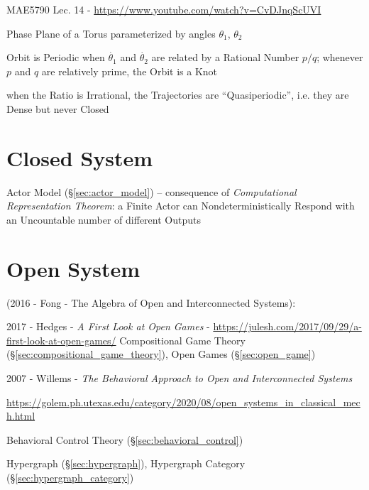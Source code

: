 MAE5790 Lec. 14 - \url{https://www.youtube.com/watch?v=CvDJnqScUVI}

Phase Plane of a Torus parameterized by angles $\theta_1$, $\theta_2$

Orbit is Periodic when $\dot{\theta_1}$ and $\dot{\theta_2}$ are related by a
Rational Number $p/q$; whenever $p$ and $q$ are relatively prime, the Orbit is a
Knot

when the Ratio is Irrational, the Trajectories are ``Quasiperiodic'', i.e. they
are Dense but never Closed



\section{Closed System}\label{sec:closed_system}


Actor Model (\S\ref{sec:actor_model}) -- consequence of \emph{Computational
  Representation Theorem}: a Finite Actor can Nondeterministically Respond with
an Uncountable number of different Outputs %



\section{Open System}\label{sec:open_system}

(2016 - Fong - The Algebra of Open and Interconnected Systems):

2017 - Hedges - \emph{A First Look at Open Games} -
\url{https://julesh.com/2017/09/29/a-first-look-at-open-games/} \fist
Compositional Game Theory (\S\ref{sec:compositional_game_theory}), Open Games
(\S\ref{sec:open_game})

2007 - Willems - \emph{The Behavioral Approach to Open and Interconnected
  Systems}

\url{https://golem.ph.utexas.edu/category/2020/08/open_systems_in_classical_mech.html}

\fist Behavioral Control Theory (\S\ref{sec:behavioral_control})

\fist Hypergraph (\S\ref{sec:hypergraph}), Hypergraph Category
(\S\ref{sec:hypergraph_category})


